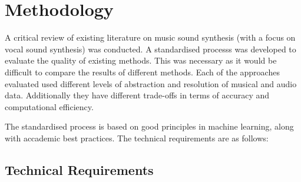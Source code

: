 \section{Methodology}

A critical review of existing literature on music sound synthesis (with a focus on vocal sound synthesis) was conducted. A standardised processs was developed to evaluate the quality of existing methods. This was necessary as it would be difficult to compare the results of different methods. Each of the approaches evaluated used different levels of abstraction and resolution of musical and audio data. Additionally they have different trade-offs in terms of accuracy and computational efficiency.

The standardised process is based on good principles in machine learning, along with accademic best practices. The technical requirements are as follows:

\subsection{Technical Requirements}

